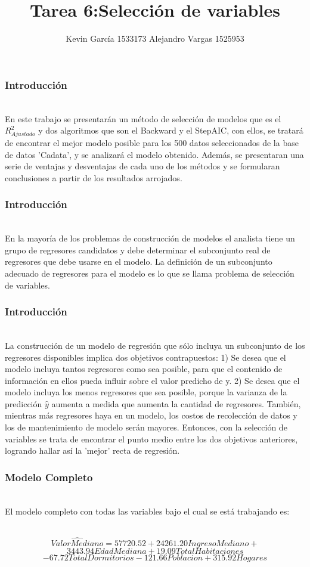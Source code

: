 \documentclass[12pt]{beamer}
\author[Kevin García - Alejandro Vargas]{Kevin García 1533173 \newline Alejandro Vargas 1525953}
\title[Tarea 6: Selección de variables]{Tarea 6:Selección de variables}
\begin{document}
\justify
\begin{frame}
\titlepage
\end{frame}

\begin{frame}
\frametitle{Introducción}
~\\En este trabajo se presentarán un método de selección de modelos que es el $R^2_{Ajustado}$ y dos algoritmos que son el Backward y el StepAIC, con ellos, se tratará de encontrar el mejor modelo posible para los 500 datos seleccionados de la base de datos 'Cadata', y se analizará el modelo obtenido. Además, se presentaran una serie de ventajas y desventajas de cada uno de los métodos y se formularan conclusiones a partir de los resultados arrojados.
\end{frame}

\begin{frame}
\frametitle{Introducción}
~\\En la mayoría de los problemas de construcción de modelos el analista tiene un grupo de regresores candidatos y debe determinar el subconjunto real de
regresores que debe usarse en el modelo. La definición de un subconjunto adecuado de regresores para el modelo es lo que se llama problema de selección de variables.
\end{frame}

\begin{frame}
\frametitle{Introducción}
~\\La construcción de un modelo de regresión que sólo incluya un subconjunto de los regresores disponibles implica dos objetivos contrapuestos: 1) Se desea que el modelo incluya tantos regresores como sea posible, para que el contenido de información en ellos pueda influir sobre el valor predicho de y. 2) Se desea que el modelo incluya los menos regresores que sea posible, porque la varianza de la predicción $\hat{y}$ aumenta a medida que aumenta la cantidad de regresores. También, mientras más regresores haya en un modelo, los costos de recolección de datos y los de mantenimiento de modelo serán mayores. Entonces, con la selección de variables se trata de encontrar el punto medio entre los dos objetivos anteriores, logrando hallar así la 'mejor' recta de regresión.
\end{frame}

\begin{frame}
\frametitle{Modelo Completo}
~\\El modelo completo con todas las variables bajo el cual se está trabajando es:

~\\$$\hat{ValorMediano} = 57720.52 + 24261.20IngresoMediano +$$
$$3443.94EdadMediana + 19.09TotalHabitaciones$$
$$ - 67.72TotalDormitorios - 121.66Poblacion +315.92Hogares $$
\end{frame}
\end{document}
